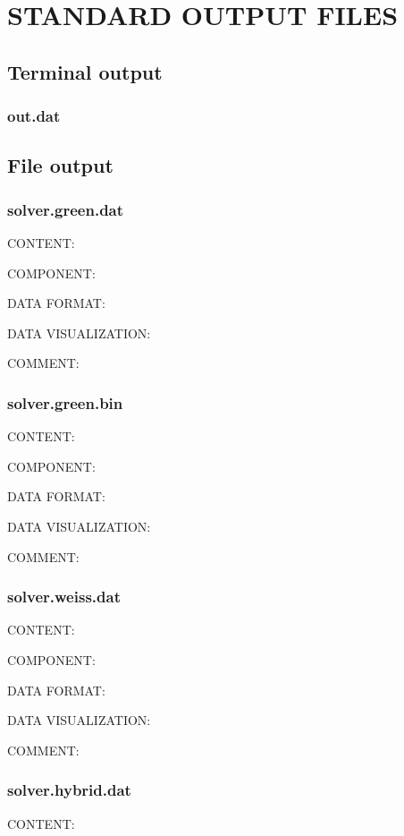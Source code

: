 \chapter{STANDARD OUTPUT FILES}
\section{Terminal output}
\subsection{out.dat}
\section{File output}
\subsection{solver.green.dat}

{\color{red}CONTENT:}

{\color{green}COMPONENT:}

{\color{blue}DATA FORMAT:}

{\color{brown}DATA VISUALIZATION:}

{\color{purple}COMMENT:}

\subsection{solver.green.bin}
{\color{red}CONTENT:}

{\color{green}COMPONENT:}

{\color{blue}DATA FORMAT:}

{\color{brown}DATA VISUALIZATION:}

{\color{purple}COMMENT:}

\subsection{solver.weiss.dat}
{\color{red}CONTENT:}

{\color{green}COMPONENT:}

{\color{blue}DATA FORMAT:}

{\color{brown}DATA VISUALIZATION:}

{\color{purple}COMMENT:}

\subsection{solver.hybrid.dat}
{\color{red}CONTENT:}

